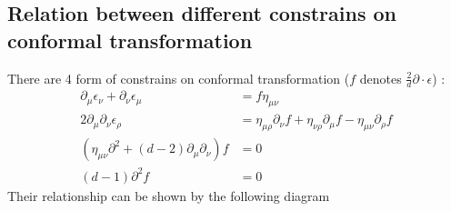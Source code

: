 \documentclass[letterpaper,12pt]{article}
\theoremstyle{definition}
\theoremstyle{remark}
\newcommand{\pmu}{\partial_{\mu}}
\newcommand{\pnu}{\partial_{\nu}}
\begin{document}
\subsection{Relation between different constrains on conformal transformation}
There are 4 form of constrains on conformal transformation ($f$ denotes $\frac{2}{d}\partial\cdot\epsilon$) :
\begin{align}
   \pmu\epsilon_\nu+\pnu\epsilon_\mu&=f\eta_{\mu\nu} \tag{*}\\
   2\pmu\pnu\epsilon_{\rho}&=\eta_{\mu\rho}\pnu f+\eta_{\nu\rho}\pmu f-\eta_{\mu\nu}\partial_{\rho} f \tag{$\star$}\\
   (\eta_{\mu\nu}\partial^2 +(d-2)\partial_{\mu}\partial_{\nu})f&=0 \tag{$\Box$} \\
   (d-1)\partial^2 f&=0 \tag{$\Diamond$}
\end{align}
Their relationship can be shown by the following diagram
\begin{center}
\end{center} 
\printbibliography
\end{document}
